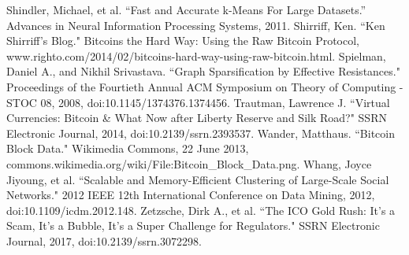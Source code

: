\documentclass[journal]{IEEEtran}
\begin{document}
\begin{thebibliography}{1}
 Shindler, Michael, et al. ``Fast and Accurate k-Means For Large Datasets.” Advances in Neural Information Processing Systems, 2011. 
 Shirriff, Ken. ``Ken Shirriff's Blog." Bitcoins the Hard Way: Using the Raw Bitcoin Protocol, www.righto.com/2014/02/bitcoins-hard-way-using-raw-bitcoin.html. 
 Spielman, Daniel A., and Nikhil Srivastava. ``Graph Sparsification by Effective Resistances." Proceedings of the Fourtieth Annual ACM Symposium on Theory of Computing - STOC 08, 2008, doi:10.1145/1374376.1374456.
 Trautman, Lawrence J. ``Virtual Currencies: Bitcoin \& What Now after Liberty Reserve and Silk Road?" SSRN Electronic Journal, 2014, doi:10.2139/ssrn.2393537.
 Wander, Matthaus. ``Bitcoin Block Data." Wikimedia Commons, 22 June 2013, commons.wikimedia.org/wiki/File:Bitcoin\_Block\_Data.png.
 Whang, Joyce Jiyoung, et al. ``Scalable and Memory-Efficient Clustering of Large-Scale Social Networks." 2012 IEEE 12th International Conference on Data Mining, 2012, doi:10.1109/icdm.2012.148.
 Zetzsche, Dirk A., et al. ``The ICO Gold Rush: It's a Scam, It's a Bubble, It's a Super Challenge for Regulators." SSRN Electronic Journal, 2017, doi:10.2139/ssrn.3072298.
\end{thebibliography}
\end{document}
